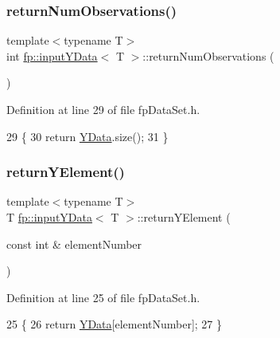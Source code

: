 \subsubsection{\texorpdfstring{return\+Num\+Observations()}{returnNumObservations()}}
{\footnotesize\ttfamily template$<$typename T$>$ \\
int \hyperlink{classfp_1_1inputYData}{fp\+::input\+Y\+Data}$<$ T $>$\+::return\+Num\+Observations (\begin{DoxyParamCaption}{ }\end{DoxyParamCaption})\hspace{0.3cm}{\ttfamily [inline]}}



Definition at line 29 of file fp\+Data\+Set.\+h.


\begin{DoxyCode}
29                                           \{
30             \textcolor{keywordflow}{return} \hyperlink{classfp_1_1inputYData_af9a5f5190739918b5b5b209ef3b18de3}{YData}.size();
31         \}
\end{DoxyCode}
\mbox{\label{classfp_1_1inputYData_a974ab138d49f7e5b3fded09f02486710}} 
\subsubsection{\texorpdfstring{return\+Y\+Element()}{returnYElement()}}
{\footnotesize\ttfamily template$<$typename T$>$ \\
T \hyperlink{classfp_1_1inputYData}{fp\+::input\+Y\+Data}$<$ T $>$\+::return\+Y\+Element (\begin{DoxyParamCaption}\item[{const int \&}]{element\+Number }\end{DoxyParamCaption})\hspace{0.3cm}{\ttfamily [inline]}}



Definition at line 25 of file fp\+Data\+Set.\+h.


\begin{DoxyCode}
25                                                          \{
26             \textcolor{keywordflow}{return} \hyperlink{classfp_1_1inputYData_af9a5f5190739918b5b5b209ef3b18de3}{YData}[elementNumber];
27         \}
\end{DoxyCode}
\mbox{\label{classfp_1_1inputYData_a5830f9e71d181554f498feaa297885ee}} 
